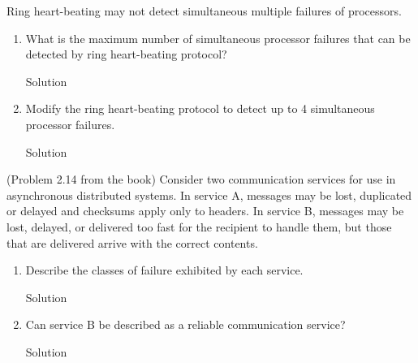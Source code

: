 \documentclass{article}
\begin{document}
\begin{spacing}{1.1}
\maketitle
\newpage
\begin{homeworkProblem}
	Ring heart-beating may not detect simultaneous multiple failures of processors.
	\begin{enumerate}[(1)]
		\item What is the maximum number of simultaneous processor failures that can be detected by ring heart-beating protocol?
			\begin{homeworkSection}{Solution}
		
			\end{homeworkSection}
		\item Modify the ring heart-beating protocol to detect up to 4 simultaneous processor failures.  
			\begin{homeworkSection}{Solution}
		
			\end{homeworkSection}
	\end{enumerate}
\end{homeworkProblem}
\newpage
\begin{homeworkProblem}
	(Problem 2.14 from the book) Consider two communication services for use in asynchronous distributed systems. In service A, messages may be lost, duplicated or delayed and checksums apply only to headers. In service B, messages may be lost, delayed, or delivered too fast for the recipient to handle them, but those that are delivered arrive with the correct contents.
	\begin{enumerate}[(1)]
		\item Describe the classes of failure exhibited by each service.
			\begin{homeworkSection}{Solution}
		
			\end{homeworkSection}
		\item Can service B be described as a reliable communication service?
			\begin{homeworkSection}{Solution}
		

\end{homeworkSection}
\end{enumerate}
\end{homeworkProblem}
\end{spacing}
\end{document}
